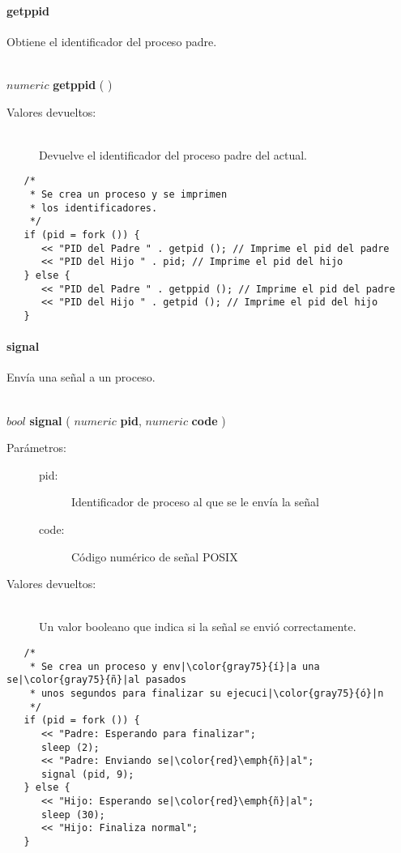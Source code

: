 \paragraph{getppid}
Obtiene el identificador del proceso padre.


\begin{framed}
\hfill \\ $numeric$ \textbf{getppid} ( )  
\begin{description}
\item[Valores devueltos:] \hfill \\
   Devuelve el identificador del proceso padre del actual.
\end{description}
\end{framed}
     
\begin{lstlisting}  
   /*
    * Se crea un proceso y se imprimen
    * los identificadores.
    */
   if (pid = fork ()) {
      << "PID del Padre " . getpid (); // Imprime el pid del padre
      << "PID del Hijo " . pid; // Imprime el pid del hijo
   } else {
      << "PID del Padre " . getppid (); // Imprime el pid del padre
      << "PID del Hijo " . getpid (); // Imprime el pid del hijo
   }
\end{lstlisting}

\paragraph{signal}
Envía una señal a un proceso. 

\begin{framed}
\hfill \\ $bool$ \textbf{signal} ( $numeric$ \textbf{pid}, $numeric$ \textbf{code} )  
\begin{description}
\item [Parámetros:] \hfill 
   \begin{description}
   \item[pid:] Identificador de proceso al que se le envía la señal
   \item[code:] Código numérico de señal POSIX
   \end{description}
\item[Valores devueltos:] \hfill \\
   Un valor booleano que indica si la señal se envió correctamente. 
\end{description}
\end{framed}
     
\begin{lstlisting}  
   /*
    * Se crea un proceso y env|\color{gray75}{í}|a una se|\color{gray75}{ñ}|al pasados
    * unos segundos para finalizar su ejecuci|\color{gray75}{ó}|n
    */
   if (pid = fork ()) {
      << "Padre: Esperando para finalizar";
      sleep (2);
      << "Padre: Enviando se|\color{red}\emph{ñ}|al";
      signal (pid, 9);
   } else {
      << "Hijo: Esperando se|\color{red}\emph{ñ}|al";
      sleep (30);
      << "Hijo: Finaliza normal";
   }
\end{lstlisting}

